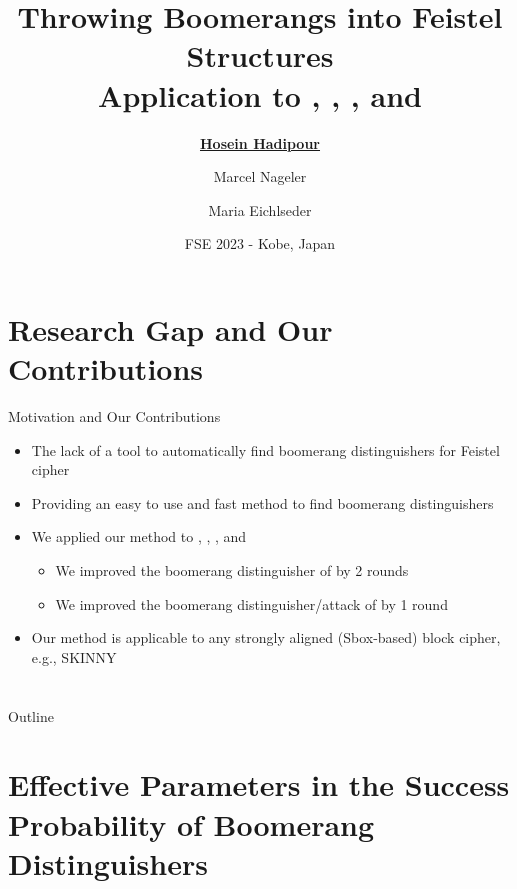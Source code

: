 \documentclass[table,aspectratio=169]{beamer}
\title{Throwing Boomerangs into Feistel Structures
\\
\small{Application to \cipher{CLEFIA}, \cipher{WARP}, \cipher{LBlock}, \cipher{LBlock-s} and \cipher{TWINE}}}
\author{\underline{\textbf{Hosein Hadipour}} \and Marcel Nageler \and Maria Eichlseder}
\date{FSE 2023 - Kobe, Japan}
\begin{document}
\begin{frame}[plain]
  \maketitle
\end{frame}


\section*{Research Gap and Our Contributions}
\begin{frame}{Motivation and Our Contributions}
\begin{itemize}
	\footnotesize
	\item<1->[\faExpeditedssl] The lack of a tool to automatically find boomerang distinguishers for Feistel cipher
\end{itemize}
\begin{itemize}
	\footnotesize
	\item<2->[\faFighterJet] Providing an easy to use and fast method to find boomerang distinguishers
	\item<3->[\faCheckCircleO] We applied our method to , , , and 
\begin{itemize}
	\footnotesize
	\item<4->[\faLineChart] We improved the boomerang distinguisher of  by 2 rounds
	\item<5->[\faLineChart] We improved the boomerang distinguisher/attack  of  by 1 round
\end{itemize}
	\item<6->[\faWrench] Our method is applicable to any strongly aligned (Sbox-based) block cipher, e.g., SKINNY
\end{itemize}
\end{frame}


\section*{}
\begin{frame}{Outline}
  \tableofcontents
\end{frame}


\section{Effective Parameters in the Success Probability of Boomerang Distinguishers}
\end{document}
